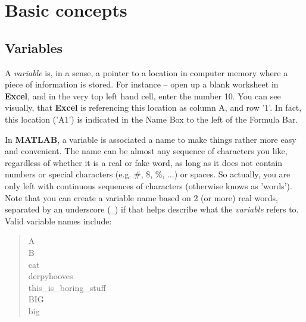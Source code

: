 \documentclass{tufte-book} %
\newenvironment{docspec}{\begin{quotation}\ttfamily\parskip0pt\parindent0pt\ignorespaces}{\end{quotation}}
\begin{document}
\section{Basic concepts}


\subsection{Variables}

A \textit{variable} is, in a sense, a pointer to a location in computer memory where a piece of information is stored. For instance -- open up a blank worksheet in \textbf{Excel}, and in the very top left hand cell, enter the number \textsf{10}. You can see visually, that \textbf{Excel} is referencing this location as column A, and row '1'. In fact, this location ('\textsf{A1}') is indicated in the \textsf{Name Box} to the left of the \textsf{Formula Bar}.

In \textbf{MATLAB}, a variable is associated a name to make things rather more easy and convenient. The name can be almost any sequence of characters you like, regardless of whether it is a real or fake word, as long as it does not contain numbers or special characters (e.g. \#, \$, \%, ...) or spaces. So actually, you are only left with continuous sequences of characters (otherwise knows as 'words'). Note that you can  create a variable name based on 2 (or more) real words, separated by an underscore (\texttt{\_}) if that helps describe what the \textit{variable} refers to. Valid variable names  include:

\begin{docspec}
A\\
B\\
cat\\
derpyhooves\\
this\_is\_boring\_stuff\\
BIG\\
big
\end{docspec}  
\end{document}
